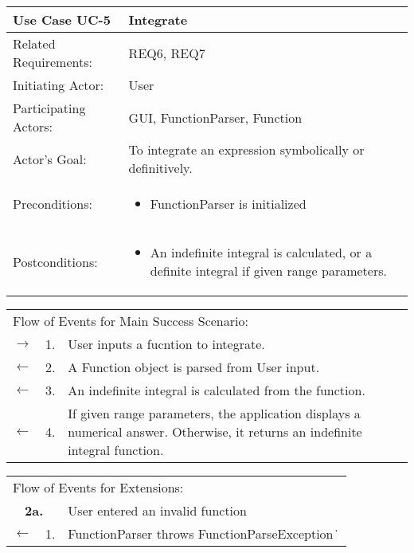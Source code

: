 \documentclass[11pt]{article}
\begin{document}
\newpage
\begin{center}
\begin{tabular}{p{1.5in}p{5in}}
\hline
\textbf{Use Case UC-5}     & \textbf{Integrate} \\ \hline
Related Requirements: & REQ6, REQ7 \\
Initiating Actor:     & User \\
Participating Actors: & GUI, FunctionParser, Function \\
Actor's Goal:          & To integrate an expression symbolically or definitively. \\
Preconditions:         & \begin{itemize}[nosep]
		      \item  FunctionParser is initialized
                         \end{itemize} \\
Postconditions:        & \begin{itemize}[nosep]
                         \item An indefinite integral is calculated, or a definite integral if given range parameters.
                         \end{itemize} \\ \hline
\end{tabular}

\begin{tabular}{p{.25in}p{.25in}p{5.8in}}
\multicolumn{3}{l}{Flow of Events for Main Success Scenario:} \\
$\rightarrow$ & 1. & User inputs a fucntion to integrate.\\
$\leftarrow$  & 2. & A Function object is parsed from User input.\\
$\leftarrow$  & 3. & An indefinite integral is calculated from the function.\\
$\leftarrow$  & 4. & If given range parameters, the application displays a numerical answer. Otherwise, it returns an indefinite integral function. 
\end{tabular}

\begin{tabular}{p{.25in}p{.25in}p{5.8in}}
\multicolumn{3}{l}{Flow of Events for Extensions:} \\
\multicolumn{2}{c}{\textbf{2a.}} & User entered an invalid function \\
$\leftarrow$  & 1.           & FunctionParser throws FunctionParseException\.\
\end{tabular}
\end{center}
\end{document}
